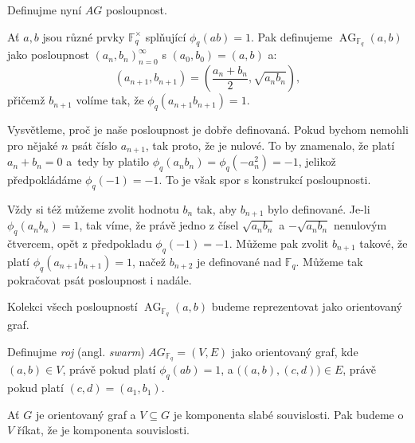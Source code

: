 \documentclass[12pt]{report}
\DeclareMathOperator{\AG}{AG}
\begin{document}
Definujme nyní $AG$ posloupnost.  

\begin{definice}
Ať $a,b$ jsou různé prvky $\mathbb{F}_q ^{\times}$ splňující $\phi_q (ab) = 1$. Pak definujeme $\AG_{\mathbb{F}_q}(a,b)$ jako posloupnost $(a_n,b_n)_{n=0}^{\infty}$ s $(a_0,b_0) = (a,b)$ a:
\begin{equation*}
\left(a_{n+1},b_{n+1} \right) = \left(\frac{a_n+b_n}{2}, \sqrt{a_n b_n} \right),
\end{equation*}
přičemž $b_{n+1}$ volíme tak, že $\phi_q (a_{n+1} b_{n+1}) = 1$.
\end{definice}
Vysvětleme, proč je naše posloupnost je dobře definovaná. Pokud bychom nemohli pro nějaké $n$ psát číslo $a_{n+1}$, tak proto, že je nulové. To by znamenalo, že platí $a_{n}+b_n = 0$ a~tedy by platilo $\phi_q (a_n b_n) = \phi_q (- a_n ^2) = -1$, jelikož předpokládáme $\phi_q(-1)=-1$. To je však spor s konstrukcí posloupnosti.

Vždy si též můžeme zvolit hodnotu $b_n$ tak, aby $b_{n+1}$ bylo definované. Je-li $\phi_q (a_n b_n) = 1$, tak víme, že právě jedno z čísel $\sqrt{a_n b_n}$ a $-\sqrt{a_n b_n}$ nenulovým čtvercem, opět z předpokladu $\phi_q(-1) = -1$. Můžeme pak zvolit $b_{n+1}$ takové, že platí $\phi_q (a_{n+1} b_{n+1}) = 1$, načež $b_{n+2}$ je definované nad $\mathbb{F}_q$. Můžeme tak pokračovat psát posloupnost i nadále.


Kolekci všech posloupností $\AG_{\mathbb{F}_q}(a,b)$ budeme reprezentovat jako orientovaný graf.
\begin{definice}
Definujme \textit{roj} (angl. \textit{swarm}) $AG_{\mathbb{F}_q} = (V,E)$ jako orientovaný graf, kde $(a,b) \in V$, právě pokud platí $\phi_q(ab) = 1$, a $\big((a,b),(c,d)\big) \in E$, právě pokud platí $(c,d) = (a_1,b_1)$.
\end{definice}

\begin{umluva}
Ať $G$ je orientovaný graf a $V \subseteq G$ je komponenta slabé souvislosti. Pak budeme o $V$ říkat, že je komponenta souvislosti.
\end{umluva}
\end{document}

